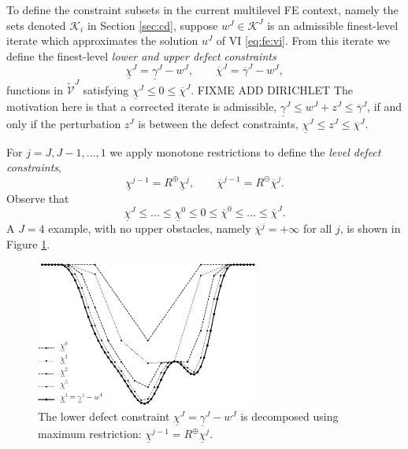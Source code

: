 \documentclass[letterpaper,final,12pt,reqno]{amsart}
\theoremstyle{cstyle}
\theoremstyle{cstyle*}
\theoremstyle{dstyle}
\numberwithin{equation}{section}
\numberwithin{figure}{section}
\numberwithin{table}{section}
\numberwithin{theorem}{section}
\newcommand{\cK}{\mathcal{K}}
\newcommand{\maxR}{R^{\bm{\oplus}}}
\newcommand{\minR}{R^{\bm{\ominus}}}
\begin{document}
To define the constraint subsets in the current multilevel FE context, namely the sets denoted $\cK_i$ in Section \ref{sec:cd}, suppose $w^J \in \cK^J$ is an admissible finest-level iterate which approximates the solution $u^J$ of VI \eqref{eq:fe:vi}.  From this iterate we define the finest-level \emph{lower and upper defect constraints} \cite{GraeserKornhuber2009}
\begin{equation}
\underline{\chi}^J = \underline{\gamma}^J - w^J, \qquad \overline{\chi}^J = \overline{\gamma}^J - w^J, \label{eq:fe:defectconstraints}
\end{equation}
functions in $\tilde{\mathcal{V}}^J$ satisfying $\underline{\chi}^J \le 0 \le \overline{\chi}^J$.  FIXME ADD DIRICHLET The motivation here is that a corrected iterate is admissible, $\underline{\gamma}^J \le w^J + z^J \le \overline{\gamma}^J$, if and only if the perturbation $z^J$ is between the defect constraints, $\underline{\chi}^J \le z^J \le \overline{\chi}^J$.

For $j=J,J-1,\dots,1$ we apply monotone restrictions to define the \emph{level defect constraints},
\begin{equation}
\underline{\chi}^{j-1} = \maxR \underline{\chi}^j, \qquad \overline{\chi}^{j-1} = \minR \overline{\chi}^j. \label{eq:fe:chilevels}
\end{equation}
Observe that
\begin{equation}
\underline{\chi}^{J} \le \dots \le \underline{\chi}^0 \le 0 \le \overline{\chi}^0 \le \dots \le \overline{\chi}^J. \label{eq:fe:chiordering}
\end{equation}
A $J=4$ example, with no upper obstacles, namely $\overline{\chi}^j=+\infty$ for all $j$, is shown in Figure \ref{fig:chiphilevels}.

\begin{figure}
\includegraphics[width=0.65\textwidth]{fixfigs/chiphilevels.pdf}
\caption{The lower defect constraint $\underline{\chi}^J = \underline{\gamma}^J - w^J$ is decomposed using maximum restriction: $\underline{\chi}^{j-1} = \maxR \underline{\chi}^j$.}
\label{fig:chiphilevels}
\end{figure}
\end{document}
